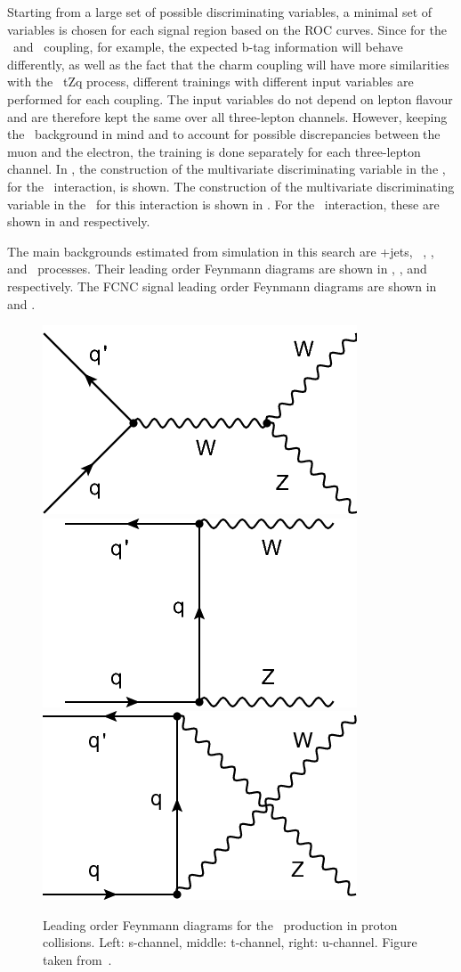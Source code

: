 Starting from a large set of possible discriminating variables, a minimal set of variables is chosen for each signal region based on the ROC curves. Since for the \Zut\ and \Zct\ coupling, for example, the expected b-tag information will behave differently, as well as the fact that the charm coupling will have more similarities with the \SM\ tZq process, different trainings with different input variables are performed for each coupling.  The input variables do not depend on lepton flavour and are therefore kept the same over all three-lepton channels. However, keeping the \NPL\ background in mind and to account for possible discrepancies between the muon and the electron, the training is done separately for each three-lepton channel. In , the construction of the multivariate discriminating variable in the \STSR, for the \Zut\ interaction, is shown. The construction of the multivariate discriminating variable in the \TTSR\ for this interaction is shown in . For the \Zct\ interaction, these are shown in  and  respectively. 

The main backgrounds estimated from simulation in this search are \WZ+jets,  \SM\ \tZq, \ttZ, and \ZZ\ processes. Their leading order Feynmann diagrams are shown in , ,   and  respectively. The FCNC signal leading order Feynmann diagrams are shown in  and . 
\begin{figure}[htbp]
	\centering
	\includegraphics[width=0.3\linewidth]{6_Search/Figures/Feynman/WZa}
	\includegraphics[width=0.3\linewidth]{6_Search/Figures/Feynman/WZb}
	\includegraphics[width=0.3\linewidth]{6_Search/Figures/Feynman/WZc}
	\caption{Leading order Feynmann diagrams for the \WZ\ production in proton collisions. Left: s-channel, middle: t-channel, right: u-channel. Figure taken from~\cite{Khachatryan:2216557}.}
	\label{fig:WZ}
\end{figure}


